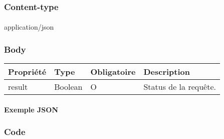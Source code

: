 	\subsubsection{Content-type}
		\paragraph{}
			application/json
	
	\subsubsection{Body}
		\begin{center}
			\begin{tabularx}{\textwidth}{| T{0.2122\textwidth} | S{0.22\textwidth} | S{0.15\textwidth} | S{0.3\textwidth} |}
				\hline
				Propriété & Type & Obligatoire & Description \\
				\hline
				result & Boolean & O & Status de la requête. \\
				\hline
			\end{tabularx}
		\end{center}
		
		\paragraph{Exemple JSON}
			\paragraph{}
			
			
	\subsubsection{Code}
		\paragraph{}
